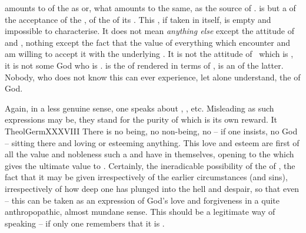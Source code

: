 \label{adthankfulness}  amounts to
 of the  as  or, what amounts to the same,
as the source of .   is but a  of
the acceptance of the , of the  of its .
This , if taken in itself, is empty and impossible to characterise.
It does not mean {\em anything else} except the attitude of 
and , nothing except the fact that   the
value of everything which  encounter and am willing to accept it with the
underlying .  It is not the attitude of \yes\ which is , it is
not some God who is .   is the  of
 rendered in terms of , is an  of
the latter.  Nobody, who does not know this  can ever
experience, let alone understand, the  of God.

Again, in a less genuine sense, one speaks about , , etc.  Misleading as such expressions may be, they stand for the
purity of  which is its own reward.  It \citet{is not chosen in
order to serve any end, or to get anything by it, but for the love of its
nobleness, and because God loveth and esteemeth it so
greatly.}{TheolGerm}{XXXVIII} There is no being, no non-being, no
 -- if one insists, no God -- sitting there and loving or esteeming
anything.  This love and esteem are first of all the value and {nobleness} such
a  and  have in themselves, opening  to the
 which gives the ultimate value to . Certainly, the ineradicable possibility of the  of ,
the fact that it may be given irrespectively of the earlier circumstances (and
sins), irrespectively of how deep one has plunged into the hell and despair, so
that even  -- this can be taken as an expression of
{God's love} and forgiveness in a quite anthropopathic, almost mundane sense.
This should 
be a legitimate way of speaking -- if only one remembers that it is
.  

